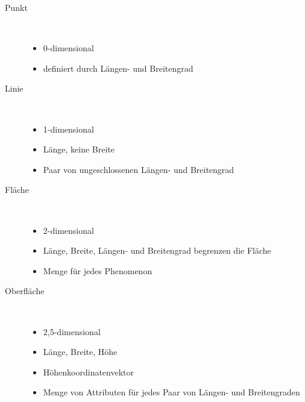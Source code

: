 \begin{description}
	\item[Punkt] \ \\\vspace*{-\baselineskip} 
		\begin{itemize}
			\item 0-dimensional
			\item definiert durch Längen- und Breitengrad
		\end{itemize}
	\item[Linie] \ \\\vspace*{-\baselineskip}
		\begin{itemize}
			\item 1-dimensional
			\item Länge, keine Breite
			\item Paar von ungeschlossenen Längen- und Breitengrad
		\end{itemize}
	\item[Fläche] \ \\\vspace*{-\baselineskip}
		\begin{itemize}
			\item 2-dimensional
			\item Länge, Breite, Längen- und Breitengrad begrenzen die Fläche
			\item Menge für jedes Phenomenon
		\end{itemize}
	\item[Oberfläche] \ \\\vspace*{-\baselineskip}
		\begin{itemize}
			\item 2,5-dimensional
			\item Länge, Breite, Höhe
			\item Höhenkoordinatenvektor
			\item Menge von Attributen für jedes Paar von Längen- und Breitengraden
		\end{itemize}
\end{description}